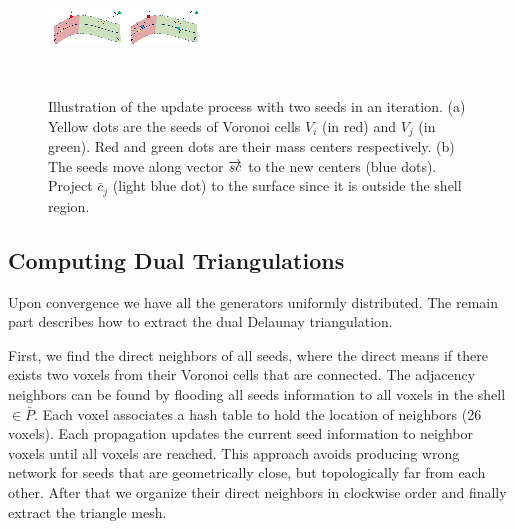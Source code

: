 \begin{figure}[tbh]
  \centering
  \includegraphics[width=1.0\linewidth]{figs/gcvt/centroid}
  \begin{scriptsize}
  \\
  \end{scriptsize}
  \vspace{-0.1in}
  \caption{Illustration of the update process with two seeds in an iteration.
  (a) Yellow dots are the seeds of Voronoi cells $V_i$ (in red) and $V_j$ (in green).
  Red and green dots are their mass centers respectively.
  (b) The seeds move along vector $\protect \overrightarrow{sc}$ to the new centers (blue dots).
  Project $\bar{c}_j$ (light blue dot) to the surface since it is outside the shell region.
  }
  \label{fig:centroid_movement}
  \end{figure}

\vspace{-0.5cm}

\subsection{Computing Dual Triangulations}
\label{sec:MeshExtraction}

  Upon convergence we have all the generators uniformly distributed.
  The remain part describes how to extract the dual Delaunay triangulation.

  First, we find the direct neighbors of all seeds, where the direct means if there exists two voxels from their Voronoi cells that are connected.
  The adjacency neighbors can be found by flooding all seeds information to all voxels in the shell $\in \bar{P}$.
  Each voxel associates a hash table to hold the location of neighbors (26 voxels).
  Each propagation updates the current seed information to neighbor voxels until all voxels are reached.
  This approach avoids producing wrong network for seeds that are geometrically close, but topologically far from each other.
  After that we organize their direct neighbors in clockwise order and finally extract the triangle mesh.

